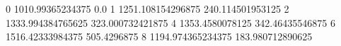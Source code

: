 0 1010.99365234375 0.0
1 1251.108154296875 240.114501953125
2 1333.994384765625 323.000732421875
4 1353.4580078125 342.46435546875
6 1516.42333984375 505.4296875
8 1194.974365234375 183.980712890625
